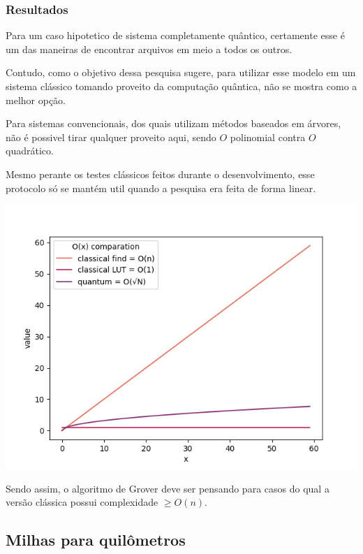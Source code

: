 \documentclass{article}
\begin{document}
\subsubsection{Resultados}

Para um caso hipotetico de sistema completamente quântico, certamente esse é um das maneiras de encontrar arquivos em meio a todos os outros.

Contudo, como o objetivo dessa pesquisa sugere, para utilizar esse modelo em um sistema clássico tomando proveito da computação quântica, não se mostra como a melhor opção.

Para sistemas convencionais, dos quais utilizam métodos baseados em árvores, não é possivel tirar qualquer proveito aqui, sendo $O$ polinomial contra $O$ quadrático.

Mesmo perante os testes clássicos feitos durante o desenvolvimento, esse protocolo só se mantém util quando a pesquisa era feita de forma linear.


\begin{center}
	\includegraphics[scale=0.5]{algorithms-finding-comparation.png}
	\label{fig:file-explorer-comparation-O}
\end{center}

Sendo assim, o algoritmo de Grover deve ser pensando para casos do qual a versão clássica possui complexidade $\ge O(n)$.


\subsection{Milhas para quilômetros}
\end{document}

